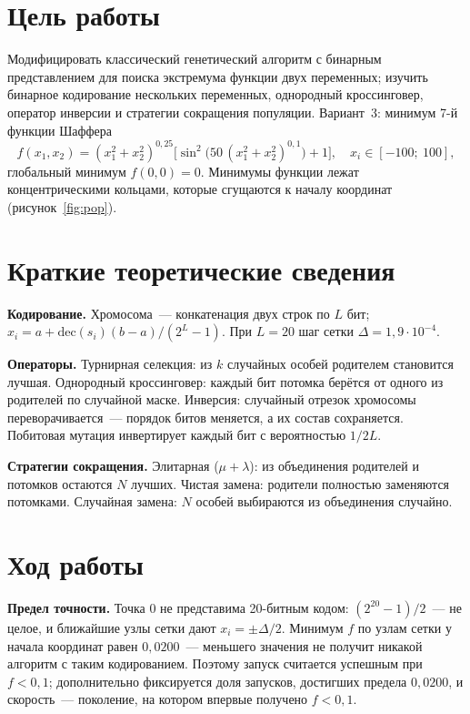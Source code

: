 \documentclass[14pt,a4paper]{extarticle}
\begin{document}

\section{Цель работы}

Модифицировать классический генетический алгоритм с бинарным представлением для поиска экстремума функции двух переменных; изучить бинарное кодирование нескольких переменных, однородный кроссинговер, оператор инверсии и стратегии сокращения популяции. Вариант~3: минимум 7-й функции Шаффера
\begin{equation}
f(x_1, x_2) = (x_1^2 + x_2^2)^{0{,}25}\bigl[\sin^2\bigl(50\,(x_1^2 + x_2^2)^{0{,}1}\bigr) + 1\bigr], \quad x_i \in [-100;\ 100],
\end{equation}
глобальный минимум $f(0, 0) = 0$. Минимумы функции лежат концентрическими кольцами, которые сгущаются к началу координат (рисунок~\ref{fig:pop}).

\section{Краткие теоретические сведения}

\textbf{Кодирование.} Хромосома~--- конкатенация двух строк по $L$ бит; $x_i = a + \mathrm{dec}(s_i)(b - a)/(2^L - 1)$. При $L = 20$ шаг сетки $\Delta = 1{,}9 \cdot 10^{-4}$.

\textbf{Операторы.} Турнирная селекция: из $k$ случайных особей родителем становится лучшая. Однородный кроссинговер: каждый бит потомка берётся от одного из родителей по случайной маске. Инверсия: случайный отрезок хромосомы переворачивается~--- порядок битов меняется, а их состав сохраняется. Побитовая мутация инвертирует каждый бит с вероятностью $1/2L$.

\textbf{Стратегии сокращения.} Элитарная ($\mu + \lambda$): из объединения родителей и потомков остаются $N$ лучших. Чистая замена: родители полностью заменяются потомками. Случайная замена: $N$ особей выбираются из объединения случайно.

\section{Ход работы}

\textbf{Предел точности.} Точка 0 не представима 20-битным кодом: $(2^{20} - 1)/2$~--- не целое, и ближайшие узлы сетки дают $x_i = \pm\Delta/2$. Минимум $f$ по узлам сетки у начала координат равен $0{,}0200$~--- меньшего значения не получит никакой алгоритм с таким кодированием. Поэтому запуск считается успешным при $f < 0{,}1$; дополнительно фиксируется доля запусков, достигших предела $0{,}0200$, и скорость~--- поколение, на котором впервые получено $f < 0{,}1$.
\end{document}
